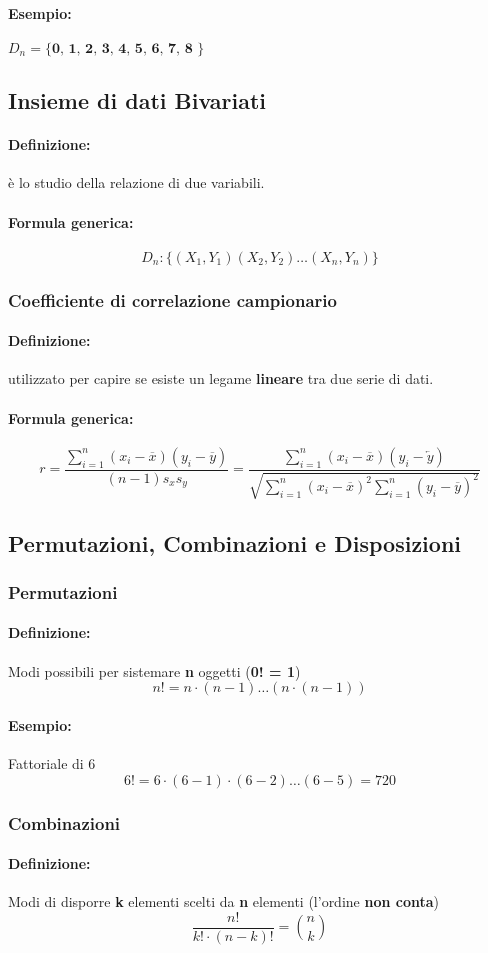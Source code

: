 \documentclass[]{article}
\newcommand{\definizione}{\paragraph{Definizione:}}
\newcommand{\formula}{\paragraph{Formula generica:}}
\begin{document}
    \paragraph{Esempio:} $D_n = \textbf{\{ 0, 1, 2, 3, 4, 5, 6, 7, 8 \}}$

    \subsection{Insieme di dati Bivariati}
    \definizione è lo studio della relazione di due variabili.
    \formula \[ D_n : \{(X_1, Y_1) (X_2, Y_2) \ldots (X_n, Y_n)\}\]

    \subsubsection{Coefficiente di correlazione campionario}
    \definizione utilizzato per capire se esiste un legame \textbf{lineare} tra due serie di dati.
    \formula 
    \begin{equation*}
        r = \frac{\sum_{i = 1}^{n}(x_i - \overline{x}) (y_i - \overline{y})}{(n-1) s_x s_y} = \frac{\sum_{i = 1}^{n} (x_i - \overline{x}) (y_i - \overleftarrow{y})}{\sqrt{\sum_{i = 1}^{n} (x_i - \overline{x})^2 \sum_{i = 1}^{n} (y_i - \overline{y})^2}}
    \end{equation*}
    \subsection{Permutazioni, Combinazioni e Disposizioni}
    \subsubsection{Permutazioni}
    \definizione Modi possibili per sistemare \textbf{n} oggetti (\textbf{0! = 1})
    \[ n! = n \cdot (n-1) \ldots (n \cdot (n-1)) \]
    \paragraph{Esempio:} Fattoriale di 6
    \[ 6! = 6 \cdot (6-1) \cdot (6-2) \ldots (6-5) = 720 \]

    \subsubsection{Combinazioni}
    \definizione Modi di disporre \textbf{k} elementi scelti da \textbf{n} elementi (l'ordine \textbf{non conta})
    \[ \frac{n!}{k! \cdot (n-k)!} = \binom{n}{k} \]
\end{document}
